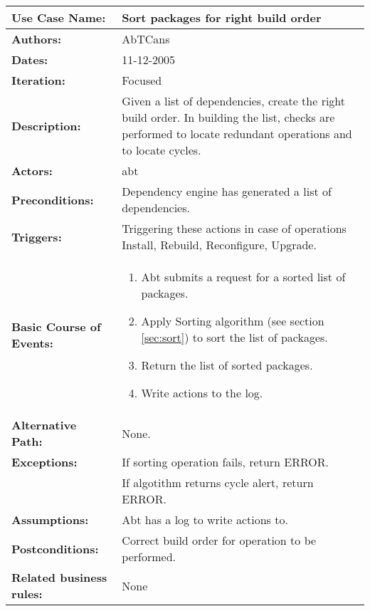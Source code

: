 \begin{tabularx}{\linewidth}{|l|X|}
\hline
\textbf{Use Case Name:} & \textbf{Sort packages for right build order} \\
\hline
\textbf{Authors:} & AbTCans\\
\hline
\textbf{Dates:} & 11-12-2005\\
\hline
\textbf{Iteration:} & Focused\\
\hline
\textbf{Description:} & Given a list of dependencies, create the right build order. In building the list, checks are performed to locate redundant operations and to locate cycles.\\
\hline
\textbf{Actors:} & abt \\ 
\hline
\textbf{Preconditions:} & Dependency engine has generated a list of dependencies.\\ 
\hline
\textbf{Triggers:} & Triggering these actions in case of operations Install, Rebuild, Reconfigure, Upgrade.\\
\hline
\textbf{Basic Course of Events:} & 
\begin{minipage}{\linewidth} 
  \vspace{0.05em}
  \begin{enumerate}
  \item Abt submits a request for a sorted list of packages.
  \item Apply Sorting algorithm (see section \ref{sec:sort}) to sort the list of packages.
  \item Return the list of sorted packages.
  \item Write actions to the log.
   \vspace{0.05em}
  \end{enumerate}
\end{minipage}
\\
\hline 
\textbf{Alternative Path:} & None.\\
\hline
\textbf{Exceptions:} & If sorting operation fails, return ERROR. \\
 & If algotithm returns cycle alert, return ERROR.\\
\hline
\textbf{Assumptions:} & Abt has a log to write actions to.\\
\hline
\textbf{Postconditions:} & Correct build order for operation to be performed.\\
\hline
\textbf{Related business rules:} & None\\
\hline
\end{tabularx}


      